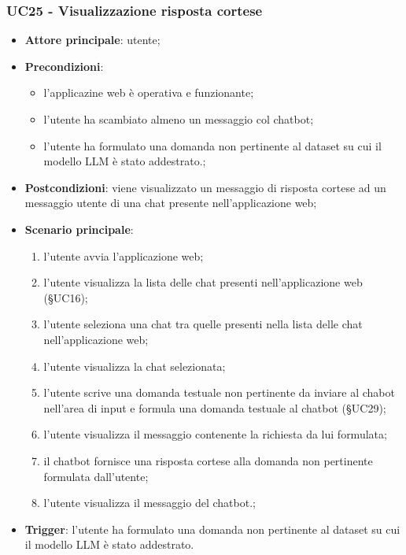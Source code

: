 \documentclass[10pt, a4paper]{article}
\begin{document}
    \subsubsection{UC25 - Visualizzazione risposta cortese}
    \begin{itemize}
        \item \textbf{Attore principale}: utente;
        \item \textbf{Precondizioni}: 
        \begin{itemize}
            \item l'applicazine web è operativa e funzionante;
            \item l'utente ha scambiato almeno un messaggio col chatbot;
            \item l'utente ha formulato una domanda non pertinente al dataset su cui il modello LLM è stato addestrato.;
        \end{itemize}
        \item \textbf{Postcondizioni}: viene visualizzato un messaggio di risposta cortese ad un messaggio utente di una chat presente nell'applicazione web;
        \item \textbf{Scenario principale}:
            \begin{enumerate}
                \item l'utente avvia l'applicazione web;
                \item l'utente visualizza la lista delle chat presenti nell'applicazione web (\S UC16);
                \item l'utente seleziona una chat tra quelle presenti nella lista delle chat nell'applicazione web;
                \item l'utente visualizza la chat selezionata;
                \item l'utente scrive una domanda testuale non pertinente da inviare al chabot nell'area di input e formula una domanda testuale al chatbot (\S UC29);
                \item l'utente visualizza il messaggio contenente la richiesta da lui formulata;
                \item il chatbot fornisce una risposta cortese alla domanda non pertinente formulata dall'utente;
                \item l'utente visualizza il messaggio del chatbot.;
            \end{enumerate}
        \item \textbf{Trigger}: l'utente ha formulato una domanda non pertinente al dataset su cui il modello LLM è stato addestrato.
    \end{itemize}
\end{document}
